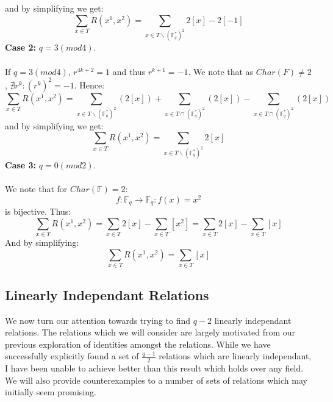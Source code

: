\documentclass[11pt]{article}
\theoremstyle{plain}
\theoremstyle{definition}
\begin{document}
and by simplifying we get:
\begin{equation*}
\sum\limits_{x \in T} R(x^1,x^2)  =  \sum\limits_{x \in T \backslash (\mathbb{F}_q ^* )^2} 2[x] - 2[-1]
\end{equation*}
\textbf{Case 2:} $q = 3 (mod 4)$.\\
\\
If $q = 3 (mod 4)$, $r^{4k+2} = 1$ and thus $r^{k+1} = -1$. We note that as $Char(F) \neq 2$, $\nexists r^k : (r^k)^2 = -1$. Hence:
\begin{equation*}
\sum\limits_{x \in T} R(x^1,x^2)  =  \sum\limits_{x \in T \backslash (\mathbb{F}_q ^* )^2} (2[x]) + \sum\limits_{x \in T \cap (\mathbb{F}_q ^* )^2} (2[x]) - \sum\limits_{x \in T \cap (\mathbb{F}_q ^* )^2} (2[x]) 
\end{equation*}
and by simplifying we get:
\begin{equation*}
\sum\limits_{x \in T} R(x^1,x^2)  =  \sum\limits_{x \in T \backslash (\mathbb{F}_q ^* )^2} 2[x]
\end{equation*}
\textbf{Case 3:} $q = 0 (mod 2)$.\\
\\
We note that for $Char(\mathbb{F})=2$:
\begin{equation*}
f:\mathbb{F}_q \rightarrow \mathbb{F}_q :
f(x) = x^{2} 
\end{equation*}
is bijective. Thus:
\begin{equation*}
\sum\limits_{x \in T} R(x^1,x^2) = \sum\limits_{x \in T} 2[x] - \sum\limits_{x \in T} [x^2] =  \sum\limits_{x \in T} 2[x] -  \sum\limits_{x \in T} [x]
\end{equation*}
And by simplifying:
\begin{equation*}
\sum\limits_{x \in T} R(x^1,x^2) =   \sum\limits_{x \in T} [x]
\end{equation*}
\pagebreak
\subsection{Linearly Independant Relations}\label{section:Linearly Independant Relations}

We now turn our attention towards trying to find $q-2$ linearly independant relations. The relations which we will consider are largely motivated from our previous exploration of identities amongst the relations. While we have successfully explicitly found a set of $\frac{q-1}{2}$ relations which are linearly independant, I have been unable to achieve better than this result which holds over any field. We will also provide counterexamples to a number of sets of relations which may initially seem promising.\\
\\
\end{document}

